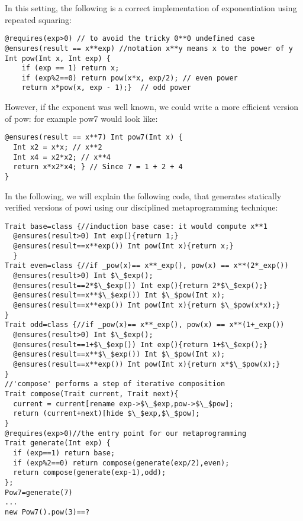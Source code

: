 In this setting, the following is a correct implementation of exponentiation using repeated squaring:
\begin{lstlisting}
@requires(exp>0) // to avoid the tricky 0**0 undefined case
@ensures(result == x**exp) //notation x**y means x to the power of y
Int pow(Int x, Int exp) {
	if (exp == 1) return x;
	if (exp%2==0) return pow(x*x, exp/2); // even power
	return x*pow(x, exp - 1);}  // odd power
\end{lstlisting}
However, if the exponent was well known, we could write a more efficient version of pow: for example pow7 would look like:
\begin{lstlisting}
@ensures(result == x**7) Int pow7(Int x) { 
  Int x2 = x*x; // x**2
  Int x4 = x2*x2; // x**4
  return x*x2*x4; } // Since 7 = 1 + 2 + 4
}
\end{lstlisting}
In the following, we will explain the following 
code, that generates statically verified versions of powi using our disciplined metaprogramming technique:
%
%
\begin{lstlisting}
Trait base=class {//induction base case: it would compute x**1
  @ensures(result>0) Int exp(){return 1;}  
  @ensures(result==x**exp()) Int pow(Int x){return x;}
  }
Trait even=class {//if _pow(x)== x**_exp(), pow(x) == x**(2*_exp())
  @ensures(result>0) Int $\_$exp();
  @ensures(result==2*$\_$exp()) Int exp(){return 2*$\_$exp();}
  @ensures(result==x**$\_$exp()) Int $\_$pow(Int x);
  @ensures(result==x**exp()) Int pow(Int x){return $\_$pow(x*x);}
}
Trait odd=class {//if _pow(x)== x**_exp(), pow(x) == x**(1+_exp())
  @ensures(result>0) Int $\_$exp();
  @ensures(result==1+$\_$exp()) Int exp(){return 1+$\_$exp();}
  @ensures(result==x**$\_$exp()) Int $\_$pow(Int x);
  @ensures(result==x**exp()) Int pow(Int x){return x*$\_$pow(x);}
}
//'compose' performs a step of iterative composition
Trait compose(Trait current, Trait next){
  current = current[rename exp->$\_$exp,pow->$\_$pow];
  return (current+next)[hide $\_$exp,$\_$pow];
}
@requires(exp>0)//the entry point for our metaprogramming
Trait generate(Int exp) {
  if (exp==1) return base;
  if (exp%2==0) return compose(generate(exp/2),even);
  return compose(generate(exp-1),odd);
};
Pow7=generate(7)
...
new Pow7().pow(3)==?
\end{lstlisting}